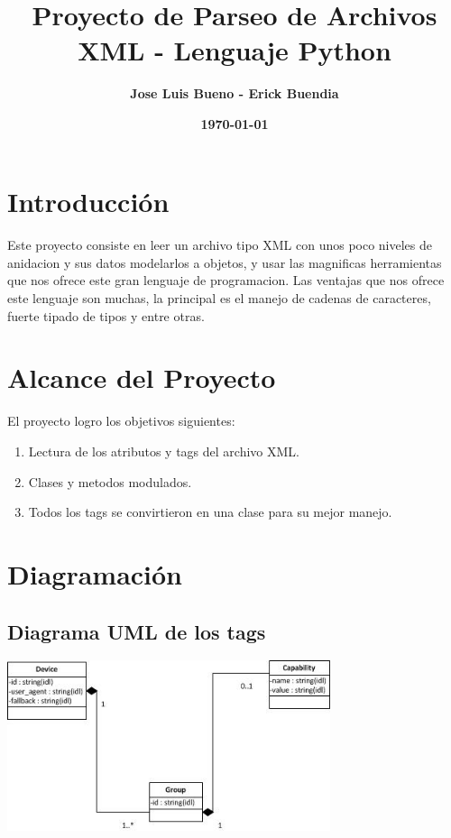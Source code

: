 \documentclass[11pt]{article}
\title{\textbf{Proyecto de Parseo de Archivos XML - Lenguaje Python}}
\author{\textbf{Jose Luis Bueno - Erick Buendia}}
\date{\textbf{\today}}
\begin{document}


\maketitle
\section{\textbf{Introducción}} 
\paragraph{} \noindent
Este proyecto consiste en leer un archivo tipo XML con unos poco niveles de anidacion y sus datos modelarlos a objetos, y usar las magnificas herramientas que nos ofrece este gran lenguaje de programacion.\newline
Las ventajas que nos ofrece este lenguaje son muchas, la principal es el manejo de cadenas de caracteres, fuerte tipado de tipos y entre otras.
\section{\textbf{Alcance del Proyecto}}

El proyecto logro los objetivos siguientes:
\begin{enumerate}
\item 
Lectura de los atributos y tags del archivo XML.

\item
Clases y metodos modulados.

\item
Todos los tags se convirtieron en una clase para su mejor manejo.
\end{enumerate}

\section{\textbf{Diagramación}}


\subsection{\textbf{Diagrama UML de los tags}}

				\begin{center}
				\includegraphics[width=0.71\textwidth]{images/diagrama}
				\end{center}
\end{document}
